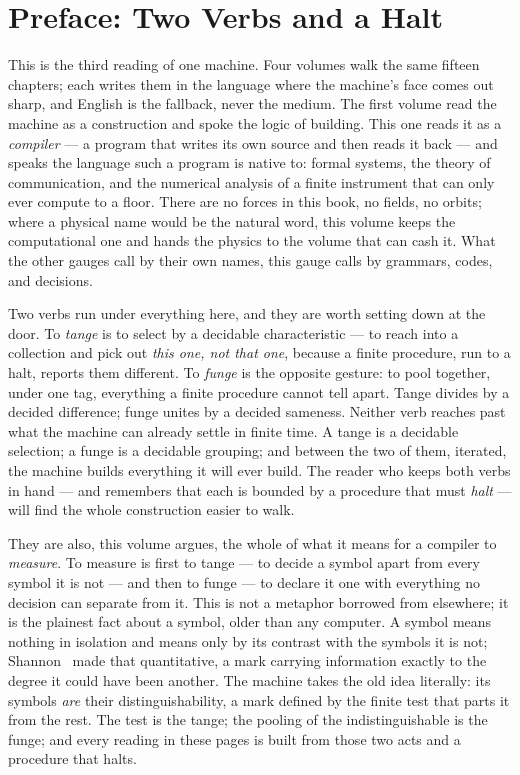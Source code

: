 \chapter*{Preface: Two Verbs and a Halt}

This is the third reading of one machine. Four volumes walk the same fifteen chapters; each writes them in the
language where the machine's face comes out sharp, and English is the fallback, never the medium. The first volume
read the machine as a construction and spoke the logic of building. This one reads it as a \emph{compiler} --- a
program that writes its own source and then reads it back --- and speaks the language such a program is native to:
formal systems, the theory of communication, and the numerical analysis of a finite instrument that can only ever
compute to a floor. There are no forces in this book, no fields, no orbits; where a physical name would be the
natural word, this volume keeps the computational one and hands the physics to the volume that can cash it. What the
other gauges call by their own names, this gauge calls by grammars, codes, and decisions.

Two verbs run under everything here, and they are worth setting down at the door. To \emph{tange} is to select by a
decidable characteristic --- to reach into a collection and pick out \emph{this one, not that one}, because a finite
procedure, run to a halt, reports them different. To \emph{funge} is the opposite gesture: to pool together, under
one tag, everything a finite procedure cannot tell apart. Tange divides by a decided difference; funge unites by a
decided sameness. Neither verb reaches past what the machine can already settle in finite time. A tange is a
decidable selection; a funge is a decidable grouping; and between the two of them, iterated, the machine builds
everything it will ever build. The reader who keeps both verbs in hand --- and remembers that each is bounded by a
procedure that must \emph{halt} --- will find the whole construction easier to walk.

They are also, this volume argues, the whole of what it means for a compiler to \emph{measure}. To measure is first to
tange --- to decide a symbol apart from every symbol it is not --- and then to funge --- to declare it one with
everything no decision can separate from it. This is not a metaphor borrowed from elsewhere; it is the plainest fact
about a symbol, older than any computer. A symbol means nothing in isolation and means only by its contrast with the
symbols it is not; Shannon~\cite{shannon1948} made that quantitative, a mark carrying information exactly to the
degree it could have been another. The machine takes the old idea literally: its symbols \emph{are} their
distinguishability, a mark defined by the finite test that parts it from the rest. The test is the tange; the pooling
of the indistinguishable is the funge; and every reading in these pages is built from those two acts and a procedure
that halts.

